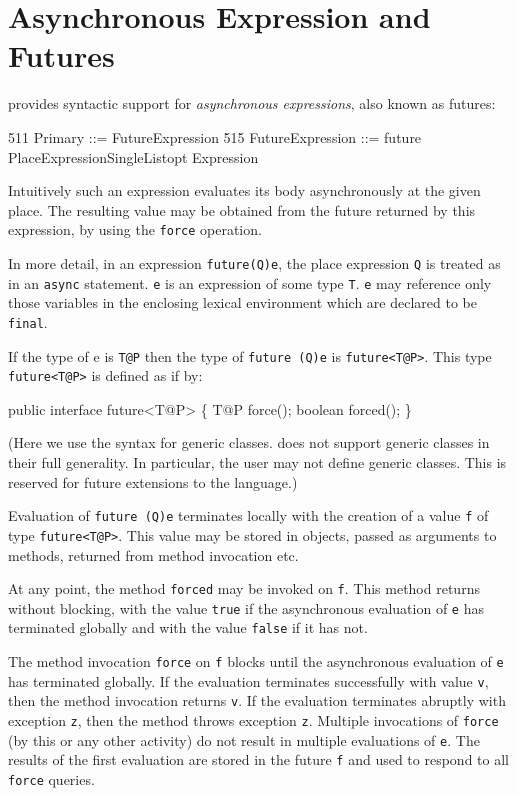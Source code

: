 
\section{Asynchronous Expression and Futures}\label{XtenFutures}

\Xten{} provides syntactic support for {\em asynchronous expressions}, also
known as futures:
\begin{x10}
511   Primary ::= FutureExpression
515   FutureExpression ::= 
        future PlaceExpressionSingleListopt 
           { Expression }
\end{x10} 
Intuitively such an expression evaluates its body asynchronously at
the given place. The resulting value may be obtained from the future
returned by this expression, by using the {\tt force} operation.

In more detail, in an expression {\tt future(Q){e}}, the place
expression {\tt Q} is treated as in an {\tt async} statement. {\tt e}
is an expression of some type {\tt T}. {\tt e} may reference only
those variables in the enclosing lexical environment which are
declared to be {\tt final}.

If the type of {\cf e} is {\tt T@P} then the type of
{\tt future (Q){e}} is {\tt future<T@P>}.  This 
type {\tt future<T@P>} is defined as if by:
\begin{x10}
public interface future<T@P> \{
  T@P force();
  boolean forced();
\}
\end{x10}

(Here we use the syntax for generic classes. \XtenCurrVer{} does not support
generic classes in their full generality. In particular, the user may
not define generic classes. This is reserved for future extensions to the
language.)

Evaluation of {\tt future (Q){e}} terminates locally with the creation
of a value {\tt f} of type {\tt future<T@P>}.  This value may be
stored in objects, passed as arguments to methods, returned from
method invocation etc. 

At any point, the method {\tt forced} may be invoked on {\tt f}. This
method returns without blocking, with the value {\tt true} if the
asynchronous evaluation of {\tt e} has terminated globally and with
the value {\tt false} if it has not.

The method invocation {\tt force} on {\tt f} blocks until the
asynchronous evaluation of {\tt e} has terminated globally. If the
evaluation terminates successfully with value {\tt v}, then the method
invocation returns {\tt v}. If the evaluation terminates abruptly with
exception {\tt z}, then the method throws exception {\tt z}. Multiple
invocations of {\tt force} (by this or any other activity) do not
result in multiple evaluations of {\tt e}. The results of the first
evaluation are stored in the future {\tt f} and used to respond to all
{\tt force} queries.

